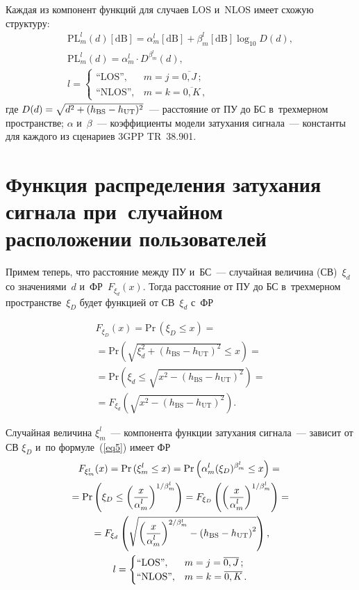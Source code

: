 \begin{multicols}{2}
Каждая из компонент функций для случаев LOS и~NLOS имеет схожую структуру:
\begin{multline}
 \mathrm{PL}^{l}_m(d)[\mathrm{dB}] = \alpha_m^{l}[\mathrm{dB}]+\beta_m^{l}[\mathrm{dB}]\log_{10}{D(d)},
 \\
 \mathrm{PL}^{l}_m(d) = \alpha_m^{l} \cdot D^{\beta_m^{l}}(d),
\\
 l=\begin{cases}
 \mbox{``}\mathrm{LOS}\mbox{''}, & m=j=\overline{0,J}\,; \\
 \mbox{``}\mathrm{NLOS}\mbox{''},& m=k=\overline{0,K}\,,
 \end{cases}
\label{eq5}
\end{multline}
где $D(d)=\sqrt{d^2+(h_{\mathrm{BS}}\hm-h_{\mathrm{UT}})^2}$~--- расстояние от ПУ до БС в~трехмерном 
пространстве; $\alpha$ и~$\beta$~--- коэффициенты модели затухания сигнала~--- 
константы для каждого из сценариев 3GPP TR~38.901.



\section{Функция распределения затухания сигнала при~случайном расположении 
пользователей} \label{sec3}

Примем теперь, что расстояние между ПУ и~БС~--- случайная величина (СВ)~$\xi_d$ 
со значениями~$d$ и~ФР~$F_{\xi_d}(x)$. Тогда расстояние от ПУ до БС в~трехмерном 
пространстве~$\xi_D$ будет функцией от СВ~$\xi_d$ с~ФР

\noindent
\begin{multline*}
F_{\xi_D}(x)  =
\mathrm{Pr}\,(\xi_D \leq x) ={}\\
{}=
\mathrm{Pr}\left(\sqrt{\xi_d^2+(h_{\mathrm{BS}}- h_{\mathrm{UT}})^2} \leq x \right) ={} \\
{} = \mathrm{Pr}\left(\xi_d \leq \sqrt{x^2-(h_{\mathrm{BS}}- h_{\mathrm{UT}})^2} \right) ={}\\
{}=
F_{\xi_d}\left(\sqrt{x^2-(h_{\mathrm{BS}}- h_{\mathrm{UT}})^2} \right).
\end{multline*}

Случайная величина $\xi_m^l$~--- компонента функции затухания сигнала~--- зависит от СВ $\xi_D$ и~по формуле~(\ref{eq5}) имеет ФР
\begin{multline*}
F_{\xi_m^l}(x)  =
\mathrm{Pr}\,(\xi_m^l \leq x) =
\mathrm{Pr}\left(\alpha_m^{l}  ({\xi}_D)^{\beta_m^{l}} \leq x \right) = {}\\
{}=
\mathrm{Pr}\left(\xi_D \leq \left(\displaystyle\frac{\displaystyle x\mathstrut}{\displaystyle \alpha_m^{l}\mathstrut}\right)^{{1}/{\beta_m^{l}}} \right) = 
F_{\xi_D}\left( \left( \displaystyle\frac{\displaystyle x\mathstrut}{\displaystyle \alpha_m^{l}\mathstrut}\right)^{{1}/{\beta_m^{l}}} 
\right) ={}\\
{}=  F_{\xi_d}\left( \sqrt{ 
\left(\displaystyle\frac{\displaystyle x\mathstrut}{\displaystyle \alpha_m^{l}\mathstrut}\right)^{{2}/{\beta_m^{l}}} - \left(h_\mathrm{BS}-h_\mathrm{UT}\right)^2 }\right), \\
 l=\begin{cases}
 \mbox{``}\mathrm{LOS}\mbox{''}, &  m=j=\overline{0,J}\,; \\
 \mbox{``}\mathrm{NLOS}\mbox{''}, & m=k=\overline{0,K}\,.
 \end{cases}
\end{multline*}


\end{multicols}
